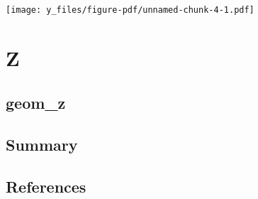 \documentclass[
  letterpaper,
  DIV=11,
  numbers=noendperiod]{scrreprt}
\begin{document}
\texttt{[image: y\_files/figure-pdf/unnamed-chunk-4-1.pdf]}

\part{Z}

\chapter{geom\_z}\label{sec-z}


\chapter{Summary}\label{summary}


\chapter*{References}\label{references}

\end{document}
